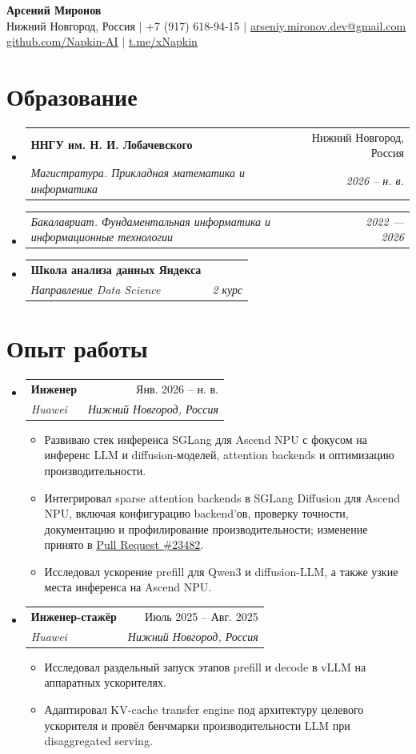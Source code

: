 \documentclass[letterpaper,10pt]{article}
\makeatletter
\newcommand{\resumeItem}[1]{\item\small{#1\vspace{-1pt}}}
\newcommand{\resumeSubheading}[4]{
  \vspace{0pt}\item
  \begin{tabular*}{0.98\textwidth}[t]{l@{\extracolsep{\fill}}r}
    \textbf{#1} & #2 \\
    \textit{\small #3} & \textit{\small #4} \\
  \end{tabular*}\vspace{-6pt}
}
\newcommand{\resumeSubSubheading}[2]{
  \item
  \begin{tabular*}{0.98\textwidth}{l@{\extracolsep{\fill}}r}
    \textit{\small #1} & \textit{\small #2} \\
  \end{tabular*}\vspace{-6pt}
}
\newcommand{\resumeSubHeadingListStart}{\begin{itemize}[leftmargin=0.14in,label={}]}
\newcommand{\resumeSubHeadingListEnd}{\end{itemize}}
\newcommand{\resumeItemListStart}{\begin{itemize}[leftmargin=0.22in,itemsep=1pt,topsep=2pt]}
\newcommand{\resumeItemListEnd}{\end{itemize}\vspace{-5pt}}
\makeatother
\begin{document}
\begin{center}
  \textbf{\Huge Арсений Миронов} \\ \vspace{2pt}
  \small Нижний Новгород, Россия $|$ +7 (917) 618-94-15 $|$
  \href{mailto:arseniy.mironov.dev@gmail.com}{\underline{arseniy.mironov.dev@gmail.com}} \\
  \href{https://github.com/Napkin-AI}{\underline{github.com/Napkin-AI}} $|$
  \href{https://t.me/xNapkin}{\underline{t.me/xNapkin}}
\end{center}

\section{Образование}
\resumeSubHeadingListStart
  \resumeSubheading
    {ННГУ им. Н. И. Лобачевского}{Нижний Новгород, Россия}
    {Магистратура. Прикладная математика и информатика}{2026 -- н. в.}
  \resumeSubSubheading
    {Бакалавриат. Фундаментальная информатика и информационные технологии}{2022 --- 2026}
  \resumeSubheading
    {Школа анализа данных Яндекса}{ }
    {Направление Data Science}{2 курс}
\resumeSubHeadingListEnd

\section{Опыт работы}
\resumeSubHeadingListStart
  \resumeSubheading
    {Инженер}{Янв. 2026 -- н. в.}
    {Huawei}{Нижний Новгород, Россия}
  \resumeItemListStart
    \resumeItem{Развиваю стек инференса SGLang для Ascend NPU с фокусом на инференс LLM и diffusion-моделей, attention backends и оптимизацию производительности.}
    \resumeItem{Интегрировал sparse attention backends в SGLang Diffusion для Ascend NPU, включая конфигурацию backend'ов, проверку точности, документацию и профилирование производительности; изменение принято в \href{https://github.com/sgl-project/sglang/pull/23482}{\underline{Pull Request \#23482}}.}
    \resumeItem{Исследовал ускорение prefill для Qwen3 и diffusion-LLM, а также узкие места инференса на Ascend NPU.}
  \resumeItemListEnd

  \resumeSubheading
    {Инженер-стажёр}{Июль 2025 -- Авг. 2025}
    {Huawei}{Нижний Новгород, Россия}
  \resumeItemListStart
    \resumeItem{Исследовал раздельный запуск этапов prefill и decode в vLLM на аппаратных ускорителях.}
    \resumeItem{Адаптировал KV-cache transfer engine под архитектуру целевого ускорителя и провёл бенчмарки производительности LLM при disaggregated serving.}
  \resumeItemListEnd
\resumeSubHeadingListEnd
\end{document}
